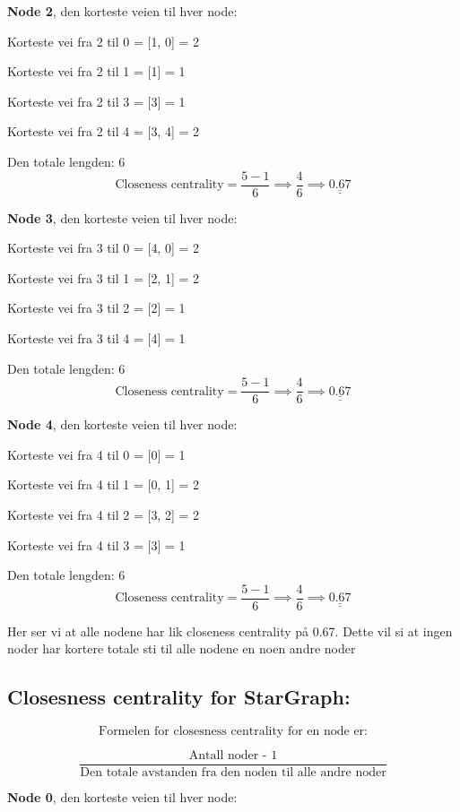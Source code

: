 \documentclass[11pt]{article}
\begin{document}
\textbf{Node 2}, den korteste veien til hver node:

Korteste vei fra 2 til 0 = {[}1, 0{]} = 2

Korteste vei fra 2 til 1 = {[}1{]} = 1

Korteste vei fra 2 til 3 = {[}3{]} = 1

Korteste vei fra 2 til 4 = {[}3, 4{]} = 2

Den totale lengden: 6
\[\text{Closeness centrality} = \frac{5 - 1}{6} \implies \frac{4}{6} \implies\underline{\underline{ 0.67 }}\]

\textbf{Node 3}, den korteste veien til hver node:

Korteste vei fra 3 til 0 = {[}4, 0{]} = 2

Korteste vei fra 3 til 1 = {[}2, 1{]} = 2

Korteste vei fra 3 til 2 = {[}2{]} = 1

Korteste vei fra 3 til 4 = {[}4{]} = 1

Den totale lengden: 6
\[\text{Closeness centrality} = \frac{5 - 1}{6} \implies \frac{4}{6} \implies\underline{\underline{ 0.67 }}\]

\textbf{Node 4}, den korteste veien til hver node:

Korteste vei fra 4 til 0 = {[}0{]} = 1

Korteste vei fra 4 til 1 = {[}0, 1{]} = 2

Korteste vei fra 4 til 2 = {[}3, 2{]} = 2

Korteste vei fra 4 til 3 = {[}3{]} = 1

Den totale lengden: 6
\[\text{Closeness centrality} = \frac{5 - 1}{6} \implies \frac{4}{6} \implies\underline{\underline{ 0.67 }}\]

Her ser vi at alle nodene har lik closeness centrality på 0.67. Dette
vil si at ingen noder har kortere totale sti til alle nodene en noen
andre noder

    \hypertarget{closesness-centrality-for-stargraph}{%
\subsection*{Closesness centrality for
StarGraph:}\label{closesness-centrality-for-stargraph}}

\[\text{Formelen for closesness centrality for en node er:}\]

\[\frac{\text{Antall noder - 1}}{\text{Den totale avstanden fra den noden til alle andre noder}}\]

\textbf{Node 0}, den korteste veien til hver node:
\end{document}
